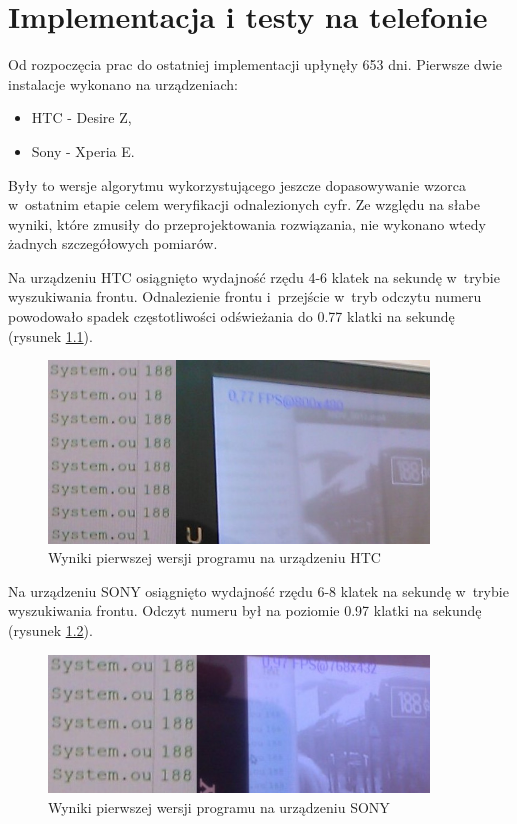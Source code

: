 \chapter{Implementacja i testy na telefonie}

Od rozpoczęcia prac do ostatniej implementacji upłynęły 653 dni.
Pierwsze dwie instalacje wykonano na urządzeniach:
\begin{itemize}
	\item HTC - Desire Z,
	\item Sony - Xperia E.
\end{itemize}

Były to wersje algorytmu wykorzystującego jeszcze dopasowywanie 
wzorca w~ostatnim etapie celem weryfikacji odnalezionych cyfr.
Ze względu na słabe wyniki, które zmusiły do przeprojektowania
rozwiązania, nie wykonano wtedy żadnych szczegółowych pomiarów.

Na urządzeniu HTC osiągnięto wydajność rzędu 4-6 klatek na sekundę
w~trybie wyszukiwania frontu. Odnalezienie frontu i~przejście 
w~tryb odczytu numeru powodowało spadek częstotliwości odświeżania
do 0.77 klatki na sekundę (rysunek \ref{fig:imp_htc_v1}).

\begin{figure}[h!]
    \centering
    \includegraphics[width=0.9\textwidth]{img/imp_htc_v1}
    \caption{Wyniki pierwszej wersji programu na urządzeniu HTC}
    \label{fig:imp_htc_v1}
\end{figure}

Na urządzeniu SONY osiągnięto wydajność rzędu 6-8 klatek na sekundę
w~trybie wyszukiwania frontu. Odczyt numeru był na poziomie 0.97
klatki na sekundę (rysunek \ref{fig:imp_sony_v1}).

\begin{figure}[h!]
    \centering
    \includegraphics[width=0.9\textwidth]{img/imp_sony_v1}
    \caption{Wyniki pierwszej wersji programu na urządzeniu SONY}
    \label{fig:imp_sony_v1}
\end{figure}

